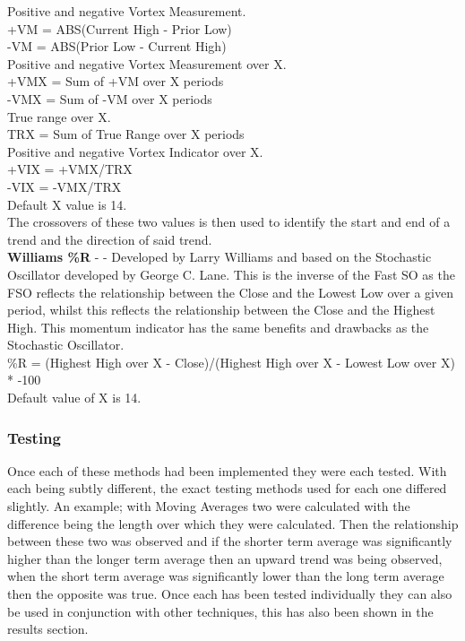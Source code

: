 \documentclass[conference]{IEEEtran}
\begin{document}
\noindent
Positive and negative Vortex Measurement.\\
+VM = ABS(Current High - Prior Low)\\
-VM = ABS(Prior Low - Current High)\\

\noindent
Positive and negative Vortex Measurement over X.\\
+VMX = Sum of +VM over X periods \\
-VMX = Sum of -VM over X periods \\

\noindent
True range over X.\\
TRX = Sum of True Range over X periods \\

\noindent
Positive and negative Vortex Indicator over X.\\
+VIX = +VMX/TRX \\
-VIX = -VMX/TRX \\

\noindent
Default X value is 14.\\

\noindent
The crossovers of these two values is then used to identify the start and end of a trend and the direction of said trend.\\

\iffalse
[]
\fi

\noindent
\textbf{Williams \%R} - \cite{Murphy1999} - Developed by Larry Williams and based on the Stochastic Oscillator developed by George C. Lane. This is the inverse of the Fast SO as the FSO reflects the relationship between the Close and the Lowest Low over a given period, whilst this reflects the relationship between the Close and the Highest High. This momentum indicator has the same benefits and drawbacks as the Stochastic Oscillator.\\

\noindent
\%R = (Highest High over X - Close)/(Highest High over X - Lowest Low over X) * -100\\
Default value of X is 14.

\iffalse
[]
\fi

\iffalse
#################################################################################
\fi

\subsubsection{Testing}

Once each of these methods had been implemented they were each tested. With each being subtly different, the exact testing methods used for each one differed slightly. An example; with Moving Averages two were calculated with the difference being the length over which they were calculated. Then the relationship between these two was observed and if the shorter term average was significantly higher than the longer term average then an upward trend was being observed, when the short term average was significantly lower than the long term average then the opposite was true. Once each has been tested individually they can also be used in conjunction with other techniques, this has also been shown in the results section. 
\end{document}

